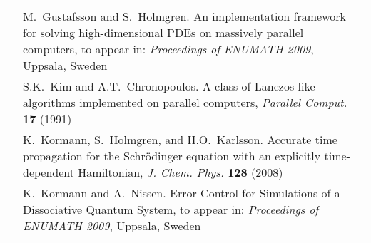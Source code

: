 \documentclass{report}
\begin{document}
\begin{tabular}{lp{}}
\hspace{-7mm}{[2]}&
\footnotesize{M.~{Gustafsson} and S.~Holmgren. An implementation
framework for solving high-dimensional PDEs on massively parallel
computers, to appear in: \emph{Proceedings of ENUMATH 2009}, Uppsala,
Sweden}
\\[1mm]
\hspace{-7mm}{[3]}&
\footnotesize{S.K.~{Kim} and A.T.~Chronopoulos. A class of Lanczos-like
algorithms implemented on parallel computers, \emph{Parallel Comput.}
{\bf 17} (1991)}
\\[1mm]
\hspace{-7mm}{[4]}&
\footnotesize{K.~{Kormann}, S.~{Holmgren}, and H.O.~{Karlsson}. Accurate
time propagation for the Schr\"odinger equation with an explicitly
time-dependent Hamiltonian, \emph{J. Chem. Phys.} {\bf 128} (2008)}
\\[1mm]
\hspace{-7mm}{[5]}&
\footnotesize{K.~{Kormann} and A.~Nissen. Error Control for Simulations
of a Dissociative Quantum System, to appear in: \emph{Proceedings of
ENUMATH 2009}, Uppsala, Sweden}
\\[1mm]
\end{tabular}
\end{document}

